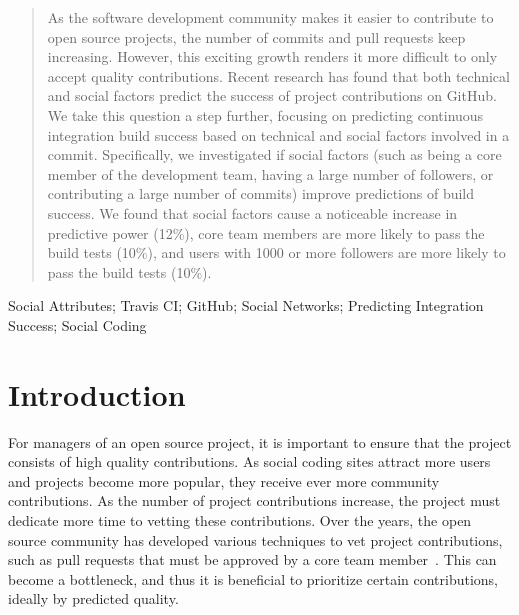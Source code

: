 \documentclass[10pt, conference]{IEEEtran}
\begin{document}




\maketitle


\begin{abstract}
As the software development community makes it easier 
to contribute to open source projects, the number of commits and pull requests 	
keep increasing. However, this exciting growth
renders it more difficult to only accept quality contributions.
Recent research has found 
that both technical and social factors predict
the success of project contributions on GitHub.  
We take this question a step further, focusing on predicting continuous
integration build success based on technical and
social factors involved in a commit.
Specifically, we investigated if social factors (such as being a
core member of the development team, having a large number of followers,
or contributing a large number of commits) improve predictions of build
success.  We found that social factors cause a noticeable increase
in predictive power (12\%), core team members are more likely to pass the build
tests (10\%), and users with 1000 or more followers are more likely to
pass the build tests (10\%).
\end{abstract}

\begin{IEEEkeywords}
Social Attributes; Travis CI; GitHub; Social Networks; Predicting Integration 
Success; Social Coding
\end{IEEEkeywords}


%
\IEEEpeerreviewmaketitle



\section{Introduction}
For managers of an open source project, it is important to ensure that the
project consists of high quality contributions.  As social coding sites attract
more users and projects become more popular, they receive ever more
community contributions.  As the number of project contributions increase,
the project must dedicate more time to vetting these contributions. 
%
Over the years, the open source
community has developed various techniques to vet project contributions, such as pull
requests that must be approved by a core team member~\cite{gousios14}. 
This can become a bottleneck, and thus it is beneficial to prioritize certain
contributions, ideally by predicted quality.
\end{document}
